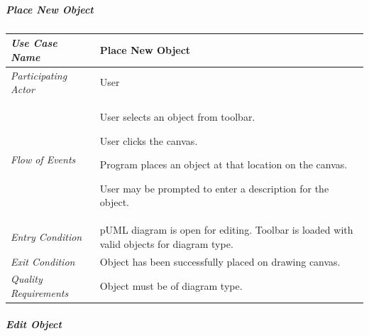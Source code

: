 \documentclass[twoside,letterpaper]{article}
\newenvironment{my_enumerate}{
\begin{enumerate}
  \setlength{\itemsep}{1pt}
  \setlength{\parskip}{0pt}
  \setlength{\parsep}{0pt}}{\end{enumerate}
}
\begin{document}

\subparagraph[\ Place New Object ] 
{\bfseries Place New Object }

\begin{flushleft}
\tablehead{}
\begin{tabular}{|m{2.0in} m{5.0in}|}
\hline
{\bfseries\emph{Use Case Name}}
& {\bfseries Place New Object}
\\\hline
\emph{Participating Actor}
& User
\\\hline
\emph{Flow of Events}
& \begin{my_enumerate}
\item User selects an object from toolbar.
\item User clicks the canvas.
\item Program places an object at that location on the canvas.
\item User may be prompted to enter a description for the object.
\end{my_enumerate}
\\\hline
\emph{Entry Condition}
& pUML diagram is open for editing. \newline 
Toolbar is loaded with valid objects for diagram type.
\\\hline
\emph{Exit Condition}
& Object has been successfully placed on drawing canvas.
\\\hline
\emph{Quality Requirements}
& Object must be of diagram type.
\\\hline
\end{tabular}
\end{flushleft}
\bigskip


\clearpage

\subparagraph[\ Edit Object ] 
{\bfseries Edit Object }
\end{document}
